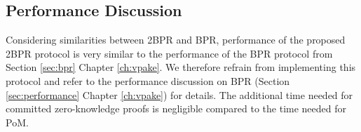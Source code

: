 \subsection{Performance Discussion}
Considering similarities between \ac{2BPR} and \ac{BPR}, performance of the proposed \ac{2BPR} protocol is very similar to the performance of the \ac{BPR} protocol from Section \ref{sec:bpr} Chapter \ref{ch:vpake}.
We therefore refrain from implementing this protocol and refer to the performance discussion on \ac{BPR} (Section \ref{sec:performance} Chapter \ref{ch:vpake}) for details.
The additional time needed for committed zero-knowledge proofs is negligible compared to the time needed for \ac{PoM}.

%
%

